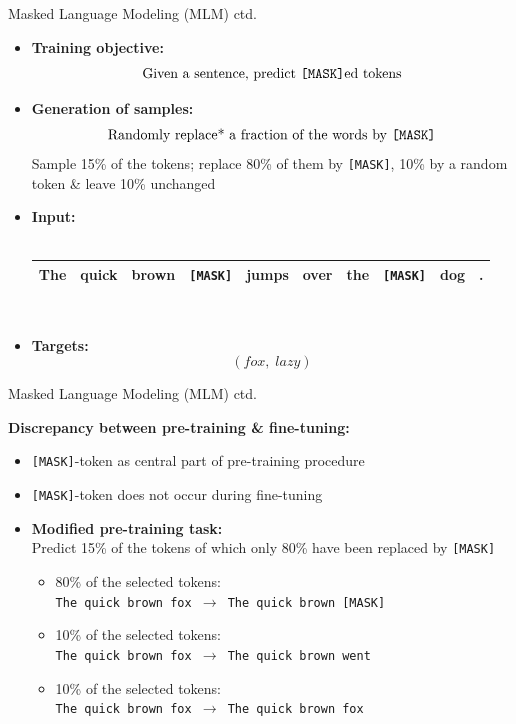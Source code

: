 \begin{frame}{Masked Language Modeling (MLM) ctd.}

\begin{itemize}
\item \textbf{Training objective:} $$\text{Given a sentence, predict \texttt{[MASK]}ed tokens}$$
\item \textbf{Generation of samples:} $$\text{Randomly replace* a fraction of the words by \texttt{[MASK]}}$$
  \scriptsize *Sample 15\% of the tokens; replace 80\% of them by \texttt{[MASK]}, 10\% by a random token \& leave 10\% unchanged
\item \normalsize \textbf{Input:}\\\mbox{}\\
			\footnotesize
\begin{tabular}{|cccccccccc|}
\hline
The & quick & brown & \cellcolor{blue!65}\texttt{[MASK]} & jumps & over & the & \cellcolor{blue!65}\texttt{[MASK]} & dog & . \\
\hline
\end{tabular}\\\mbox{}
\item \normalsize \textbf{Targets:} $$(fox,\; lazy)$$
\end{itemize}
\end{frame}

\begin{frame}{Masked Language Modeling (MLM) ctd.}

\vfill

\textbf{Discrepancy between pre-training \& fine-tuning:}

\begin{itemize}
	\item \texttt{[MASK]}-token as central part of pre-training procedure
	\item \texttt{[MASK]}-token does not occur during fine-tuning
	\item \textbf{Modified pre-training task:}\\
				Predict 15\% of the tokens of which only 80\% have been replaced by \texttt{[MASK]}
				\begin{itemize}
					\item 80\% of the selected tokens:\\
								\texttt{The quick brown fox $\rightarrow$ The quick brown [MASK]}
					\item 10\% of the selected tokens:\\
								\texttt{The quick brown fox $\rightarrow$ The quick brown went}
					\item 10\% of the selected tokens:\\
								\texttt{The quick brown fox $\rightarrow$ The quick brown fox}
			\end{itemize}
\end{itemize}
	
\vfill

\end{frame}

